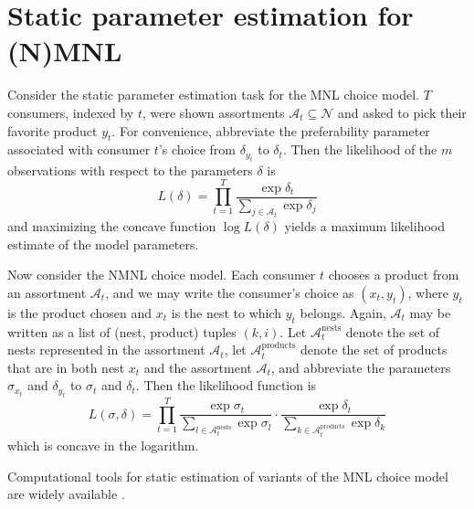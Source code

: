 \documentclass[preprint,12pt,authoryear]{elsarticle}
\begin{document}
\section{Static parameter estimation for (N)MNL}
Consider the static parameter estimation task for the MNL choice model. $T$ consumers, indexed by $t$, were shown assortments $\mathcal{A}_t \subseteq \mathcal{N}$ and asked to pick their favorite product $y_t$. For convenience, abbreviate the preferability parameter associated with consumer $t$'s choice from $\delta_{y_t}$ to $\delta_t$. Then the likelihood of the $m$ observations with respect to the parameters $\delta$ is
\begin{equation} \label{mnllikelihood}
L(\delta) = \prod_{t=1}^T \frac{\exp \delta_t}{\sum_{j\in \mathcal{A}_t} \exp \delta_j}
\end{equation}
and maximizing the concave function $\log L(\delta)$ yields a maximum likelihood estimate of the model parameters.

Now consider the NMNL choice model. Each consumer $t$ chooses a product from an assortment $\mathcal{A}_t$, and we may write the consumer's choice as $(x_t, y_t)$, where $y_t$ is the product chosen and $x_t$ is the nest to which $y_t$ belongs. Again, $\mathcal{A}_t$ may be written as a list of (nest, product) tuples $(k, i)$. Let $\mathcal{A}_t^{\text{nests}}$ denote the set of nests represented in the assortment $\mathcal{A}_t$, let $\mathcal{A}_{t}^{\text{products}}$ denote the set of products that are in both nest $x_t$ and the assortment $\mathcal{A}_t$, and abbreviate the parameters $\sigma_{x_t}$ and $\delta_{y_t}$ to $\sigma_t$ and $\delta_t$. Then the likelihood function is
\begin{equation}L(\sigma, \delta) = \prod_{t=1}^T \frac{\exp \sigma_t}{\sum_{l\in \mathcal{A}_t^{\text{nests}}} \exp \sigma_l} \cdot \frac{\exp \delta_t}{\sum_{k \in \mathcal{A}_{t}^{\text{products}}} \exp \delta_k}\end{equation}
which is concave in the logarithm.

Computational tools for static estimation of variants of the MNL choice model are widely available \cite[e.g.][]{croissantnd}.
\end{document}
